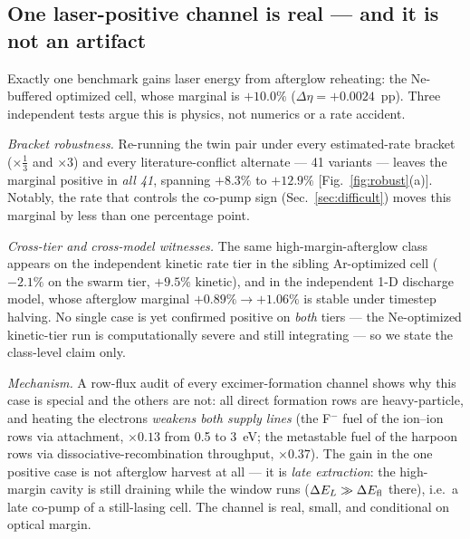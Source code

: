 \documentclass[aps,pra,preprint,longbibliography,nofootinbib]{revtex4-2}
\begin{document}
\subsection{One laser-positive channel is real --- and it is not an
artifact}
\label{sec:real}

Exactly one benchmark gains laser energy from afterglow reheating: the
Ne-buffered optimized cell, whose marginal is $+10.0\%$
($\Delta\eta=+0.0024$~pp). Three independent tests argue this is
physics, not numerics or a rate accident.

\emph{Bracket robustness.} Re-running the twin pair under every
estimated-rate bracket ($\times\tfrac13$ and $\times3$) and every
literature-conflict alternate --- 41 variants --- leaves the marginal
positive in \emph{all 41}, spanning $+8.3\%$ to $+12.9\%$
[Fig.~\ref{fig:robust}(a)]. Notably, the rate that controls the
co-pump sign (Sec.~\ref{sec:difficult}) moves this marginal by less
than one percentage point.

\emph{Cross-tier and cross-model witnesses.} The same
high-margin-afterglow class appears on the independent kinetic rate
tier in the sibling Ar-optimized cell ($-2.1\%$ on the swarm tier,
$+9.5\%$ kinetic), and in the independent 1-D discharge model, whose
afterglow marginal $+0.89\%\to+1.06\%$ is stable under timestep
halving. No single case is yet confirmed positive on \emph{both} tiers
--- the Ne-optimized kinetic-tier run is computationally severe and
still integrating --- so we state the class-level claim only.

\emph{Mechanism.} A row-flux audit of every excimer-formation channel
shows why this case is special and the others are not: all direct
formation rows are heavy-particle, and heating the electrons
\emph{weakens both supply lines} (the F$^-$ fuel of the ion--ion rows
via attachment, $\times0.13$ from 0.5 to 3~eV; the metastable fuel of
the harpoon rows via dissociative-recombination throughput,
$\times0.37$). The gain in the one positive case is not afterglow
harvest at all --- it is \emph{late extraction}: the high-margin cavity
is still draining while the window runs
($\Delta E_L \gg \Delta E_{\rm fl}$ there), i.e.\ a late co-pump of a
still-lasing cell. The channel is real, small, and conditional on
optical margin.
\end{document}
